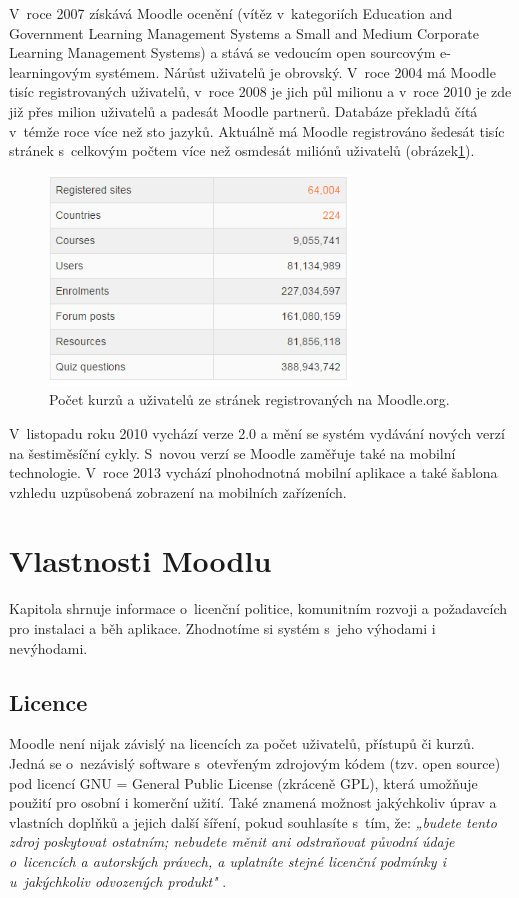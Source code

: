 \documentclass[
print,
  11pt,
  table,   
  nolof,    
  nolot,
  oneside,final
]{fithesis3}
\begin{document}
V~roce 2007 získává Moodle ocenění (vítěz v~kategoriích Education and Government Learning Management Systems a Small and Medium Corporate Learning Management Systems) a stává se vedoucím open sourcovým e-learningovým systémem. Nárůst uživatelů je obrovský. V~roce 2004 má Moodle tisíc registrovaných uživatelů, v~roce 2008 je jich půl milionu a v~roce 2010 je zde již přes milion uživatelů a padesát Moodle partnerů. Databáze překladů čítá v~témže roce více než sto jazyků. Aktuálně má Moodle registrováno šedesát tisíc stránek s~celkovým počtem více než osmdesát miliónů uživatelů (obrázek\ref{fig:moodlestats}). 
 \begin{figure}
		  \begin{center}
		    \includegraphics[width=80mm]{images/statistiky-moodle.png}
		   \end{center}
		  \caption{Počet kurzů a uživatelů ze stránek registrovaných na Moodle.org.   \cite{moodle-stats}}
		  \label{fig:moodlestats}
		\end{figure}

V~listopadu roku 2010 vychází verze 2.0 a mění se systém vydávání nových verzí na šestiměsíční cykly. S~novou verzí se Moodle zaměřuje také na mobilní technologie. V~roce 2013 vychází plnohodnotná mobilní aplikace a také šablona vzhledu uzpůsobená zobrazení na mobilních zařízeních.

		

	\section{Vlastnosti Moodlu}
Kapitola shrnuje informace o~licenční politice, komunitním rozvoji a požadavcích pro instalaci a běh aplikace. Zhodnotíme si systém s~jeho výhodami i nevýhodami.
		\subsection{Licence}
Moodle není nijak závislý na licencích za počet uživatelů, přístupů či kurzů. Jedná se o~nezávislý software s~otevřeným zdrojovým kódem (tzv. open source) pod licencí GNU = General Public License (zkráceně GPL), která umožňuje použití pro osobní i komerční užití. Také znamená možnost jakýchkoliv úprav a vlastních doplňků a jejich další šíření, pokud souhlasíte s~tím, že: \emph{„budete tento zdroj poskytovat ostatním; nebudete měnit ani odstraňovat původní údaje o~licencích a autorských právech, a uplatníte stejné licenční podmínky i u~jakýchkoliv odvozených produkt"} \cite{moodle-what-is}. 
\end{document}
